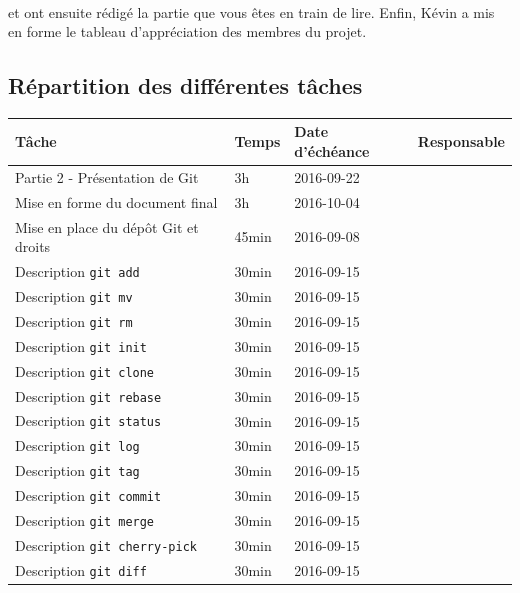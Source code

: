 \documentclass[11pt,canadien]{article}
\begin{document}
\paragraph{}\joffrey et \julien ont ensuite rédigé la partie que vous êtes en train de lire. Enfin, Kévin a mis en forme le tableau d'appréciation des membres du projet.

\clearpage
\begin{appendices} %

\section{Répartition des différentes tâches}
\begin{tabular}{l l l l}
	\textbf{Tâche} & \textbf{Temps} & \textbf{Date d'échéance} & \textbf{Responsable}
	\\ \hline
	   Partie 2 - Présentation de Git       & 3h    & 2016-09-22 & \antoine
	\\ Mise en forme du document final      & 3h    & 2016-10-04 & \kevin
	\\ Mise en place du dépôt Git et droits & 45min & 2016-09-08 & \joffrey
	\\ Description \texttt{git add}         & 30min & 2016-09-15 & \estelle
	\\ Description \texttt{git mv}          & 30min & 2016-09-15 & \estelle
	\\ Description \texttt{git rm}          & 30min & 2016-09-15 & \estelle
	\\ Description \texttt{git init}        & 30min & 2016-09-15 & \julien
	\\ Description \texttt{git clone}       & 30min & 2016-09-15 & \julien
	\\ Description \texttt{git rebase}      & 30min & 2016-09-15 & \julien
	\\ Description \texttt{git status}      & 30min & 2016-09-15 & \valentin
	\\ Description \texttt{git log}         & 30min & 2016-09-15 & \valentin
	\\ Description \texttt{git tag}         & 30min & 2016-09-15 & \valentin
	\\ Description \texttt{git commit}      & 30min & 2016-09-15 & \joffrey
	\\ Description \texttt{git merge}       & 30min & 2016-09-15 & \joffrey
	\\ Description \texttt{git cherry-pick} & 30min & 2016-09-15 & \joffrey
	\\ Description \texttt{git diff}        & 30min & 2016-09-15 & \karen

\end{tabular}
\end{appendices}
\end{document}
